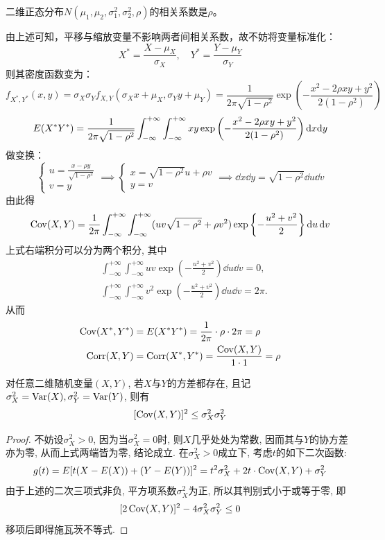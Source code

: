 \begin{example}\label{exam:3.4.9}
    二维正态分布$N(\mu_{1}, \mu_{2}, \sigma_{1}^{2}, \sigma_{2}^{2}, \rho)$的相关系数是$\rho$。
\end{example}
\begin{solution}
    由上述可知，平移与缩放变量不影响两者间相关系数，故不妨将变量标准化：
    \[ X^*=\frac{X-\mu_X}{\sigma_X},\quad Y^*=\frac{Y-\mu_Y}{\sigma_Y} \]
    则其密度函数变为：
    \[ f_{X^*,Y^*}(x,y) = \sigma_X \sigma_Y f_{X,Y}(\sigma_X x+\mu_X,\sigma_Y y+\mu_Y) = \frac{1}{2 \pi \sqrt{1-\rho^2}} \exp \left( - \frac{x^2 - 2 \rho x y +y^2}{2(1-\rho^2)} \right)\]
    \[ E(X^* Y^*) = \frac{1}{2 \pi \sqrt{1-\rho^2}} \int_{-\infty}^{+\infty}\int_{-\infty}^{+\infty}x y \exp \left( - \frac{x^2 - 2 \rho x y +y^2}{2(1-\rho^2)} \right) \mathrm{d} x \mathrm{d} y\]
    做变换：
    \[ \begin{cases}
            u = \frac{x- \rho y}{\sqrt{1-\rho^2}} \\
            v = y
        \end{cases} \implies \begin{cases}
            x = \sqrt{1-\rho^2}u + \rho v \\
            y =  v
        \end{cases} \implies \dd x\dd y= \sqrt{1-\rho^2}\dd u\dd v \]
    由此得
    \[ \operatorname{Cov}(X,Y)=\frac{1}{2\pi}\int_{-\infty}^{+\infty}\int_{-\infty}^{+\infty}(uv\sqrt{1-\rho^2}+\rho v^2)\exp\left\{ -\frac{u^2+v^2}{2} \right\}\mathop{}\!\mathrm d u\mathop{}\!\mathrm d v \]
    上式右端积分可以分为两个积分, 其中
    \begin{align*}
         & \int_{-\infty}^{+\infty}\int_{-\infty}^{+\infty} uv\exp\left( -\frac{u^2+v^2}{2} \right)\dd u\dd v=0,     \\
         & \int_{-\infty}^{+\infty}\int_{-\infty}^{+\infty} v^2\exp\left( -\frac{u^2+v^2}{2} \right)\dd u\dd v=2\pi.
    \end{align*}
    从而
    \begin{align*}
        \operatorname{Cov}(X^*,Y^*) & =E(X^* Y^*)=\frac{1}{2\pi}\cdot \rho\cdot 2\pi=\rho \\
        \operatorname{Corr}(X,Y)    & =\operatorname{Corr}(X^*,Y^*)=\frac{\operatorname{Cov}(X,Y)}{1 \cdot 1}=\rho
    \end{align*}
\end{solution}

\begin{lemma}[施瓦茨不等式]
    对任意二维随机变量$(X,Y)$, 若$X$与$Y$的方差都存在, 且记$\sigma_{X}^2=\operatorname{Var}(X),\sigma_{Y}^2=\operatorname{Var}(Y)$, 则有
    \[ [\operatorname{Cov}(X,Y)]^2\leq \sigma_{X}^2\sigma_{Y}^2 \]
\end{lemma}
\begin{proof}
    不妨设$\sigma_{X}^2>0$, 因为当$\sigma_{X}^2=0$时, 则$X$几乎处处为常数, 因而其与$Y$的协方差亦为零, 从而上式两端皆为零, 结论成立. 在$\sigma_{X}^2>0$成立下, 考虑$t$的如下二次函数:
    \[ g(t)=E[t(X-E(X))+(Y-E(Y))]^2=t^2 \sigma_{X}^2+2t\cdot \operatorname{Cov}(X,Y)+\sigma_{Y}^2 \]
    由于上述的二次三项式非负, 平方项系数$\sigma_{X}^2$为正, 所以其判别式小于或等于零, 即
    \[ [2\operatorname{Cov}(X,Y)]^2-4\sigma_{X}^2\sigma_{Y}^2\leq0 \]
    移项后即得施瓦茨不等式.
\end{proof}

